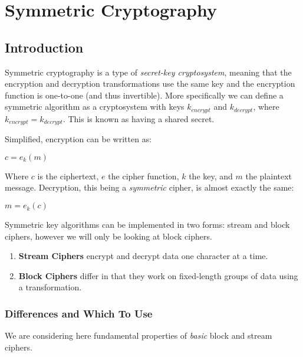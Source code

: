 
\chapter{Symmetric Cryptography} 
\label{Chapter4}

\section{Introduction}

Symmetric cryptography is a type of \emph{secret-key cryptosystem}, meaning that the encryption and decryption transformations use the same key and the encryption function is one-to-one (and thus invertible). More specifically we can define a symmetric algorithm as a cryptosystem with keys $k_{encrypt}$ and $k_{decrypt}$, where $k_{encrypt} = k_{decrypt}$. This is known as having a shared secret.

Simplified, encryption can be written as:

\begin{center}
  $c = e_k(m)$
\end{center}

Where $c$ is the ciphertext, $e$ the cipher function, $k$ the key, and $m$ the plaintext message. Decryption, this being a \emph{symmetric} cipher, is almost exactly the same:

\begin{center}
  $m = e_k(c)$
\end{center}

Symmetric key algorithms can be implemented in two forms: stream and block ciphers, however we will only be looking at block ciphers. 

\begin{enumerate}
  \item \textbf{Stream Ciphers} encrypt and decrypt data one character at a time.
  \item \textbf{Block Ciphers} differ in that they work on fixed-length groups of data using a transformation.
\end{enumerate}

  \subsection{Differences and Which To Use}
  
  We are considering here fundamental properties of \emph{basic} block and stream ciphers.

